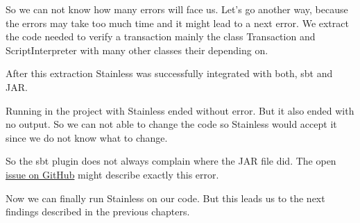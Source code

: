 So we can not know how many errors will face us.
Let's go another way, because the errors may take too much time and it might lead to a next error.
We extract the code needed to verify a transaction mainly the class Transaction and ScriptInterpreter with many other classes their depending on.

After this extraction Stainless was successfully integrated with both, sbt and JAR.

Running  in the project with Stainless ended without error.
But it also ended with no output.
So we can not able to change the code so Stainless would accept it since we do not know what to change.

So the sbt plugin does not always complain where the JAR file did.
The open \href{https://github.com/epfl-lara/stainless/issues/484}{issue  on GitHub} might describe exactly this error.

Now we can finally run Stainless on our code.
But this leads us to the next findings described in the previous chapters.
